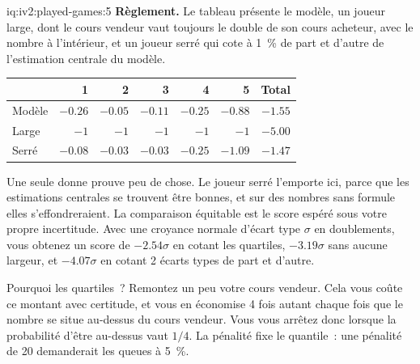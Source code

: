 \begin{solution}{iq:iv2:played-games:5}
\medskip
\textbf{Règlement.} Le tableau présente le modèle, un joueur large, dont le cours vendeur vaut toujours le double de son cours acheteur, avec le nombre à l'intérieur, et un joueur serré qui cote à 1~\% de part et d'autre de l'estimation centrale du modèle.
\begin{center}\small
\begin{tabular}{@{}lrrrrrr@{}}
 & 1 & 2 & 3 & 4 & 5 & Total \\ \hline
Modèle & $-0.26$ & $-0.05$ & $-0.11$ & $-0.25$ & $-0.88$ & $-1.55$ \\
Large & $-1$ & $-1$ & $-1$ & $-1$ & $-1$ & $-5.00$ \\
Serré & $-0.08$ & $-0.03$ & $-0.03$ & $-0.25$ & $-1.09$ & $-1.47$
\end{tabular}
\end{center}
Une seule donne prouve peu de chose. Le joueur serré l'emporte ici, parce que les estimations centrales se trouvent être bonnes, et sur des nombres sans formule elles s'effondreraient. La comparaison équitable est le score espéré sous votre propre incertitude. Avec une croyance normale d'écart type $\sigma$ en doublements, vous obtenez un score de $-2.54\sigma$ en cotant les quartiles, $-3.19\sigma$ sans aucune largeur, et $-4.07\sigma$ en cotant 2 écarts types de part et d'autre.

Pourquoi les quartiles~? Remontez un peu votre cours vendeur. Cela vous coûte ce montant avec certitude, et vous en économise 4 fois autant chaque fois que le nombre se situe au-dessus du cours vendeur. Vous vous arrêtez donc lorsque la probabilité d'être au-dessus vaut $1/4$. La pénalité fixe le quantile~: une pénalité de 20 demanderait les queues à 5~\%.

\end{solution}

